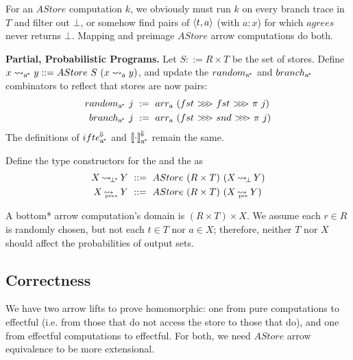 \documentclass{llncs}
\renewcommand{\paragraph}[1]{\vspace{0.5\baselineskip}\noindent\textbf{{#1}.}\hspace{0.25\baselineskip}}
\newcommand{\arrow}{\rightsquigarrow}
\newcommand{\conv}{^{\mspace{-2mu}\Downarrow\mspace{-2mu}}}
\newcommand{\meaningofconv}[1]{\left\llbracket{#1}\right\rrbracket\conv}
\newcommand{\arrowarr}{\ensuremath{arr}}
\newcommand{\arrowcomp}{\ensuremath{{>}\mspace{-6mu}{>}\mspace{-6mu}{>}}}
\newcommand{\arrowconvif}{\ensuremath{ifte\conv}}
\newcommand{\gen}{_\mathrm{a}}
\newcommand{\genc}{_\mathrm{a^{\mspace{-2mu}*}}}
\DeclareMathOperator{\botto}{\arrow_{\mspace{-3mu}\bot}}
\newcommand{\pre}{_\mathrm{pre}}
\DeclareMathOperator{\preto}{\arrow_{\mspace{-19mu}\pre}}
\newcommand{\pbot}{{\bot^{\mspace{-4mu}*}}}
\DeclareMathOperator{\pbotto}{\arrow_{\mspace{-3mu}\pbot}}
\DeclareMathOperator{\ppreto}{\arrow_{\mspace{-19mu}_{\mathrm{pre*}}}}
\begin{document}
For an $AStore$ computation $k$, we obviously must run $k$ on every branch trace in $T$ and filter out $\bot$, or somehow find pairs of $\langle{t,a}\rangle$ (with $a : x$) for which $agrees$ never returns $\bot$.
Mapping and preimage $AStore$ arrow computations do both.

\paragraph{Partial, Probabilistic Programs}
Let $S ::= R \times T$ be the set of stores.
Define $x \arrow\genc y ::= AStore~S~(x \arrow\gen y)$, and update the $random\genc$ and $branch\genc$ combinators to reflect that stores are now pairs:
\begin{equation}
\begin{aligned}
	random\genc~j &\ := \ \arrowarr\gen~(fst~\arrowcomp~fst~\arrowcomp~\pi~j)
\\
	branch\genc~j &\ := \ \arrowarr\gen~(fst~\arrowcomp~snd~\arrowcomp~\pi~j)
\end{aligned}
\end{equation}
The definitions of $\arrowconvif\genc$ and $\meaningofconv{\cdot}\genc$ remain the same.

\begin{definition}
Define the type constructors for the  and the  as
\begin{equation}
\begin{aligned}
	X \pbotto Y &\ ::=\ AStore~(R \times T)~(X \botto Y) \\
	X \ppreto Y &\ ::=\ AStore~(R \times T)~(X \preto Y) \\
\end{aligned}
\end{equation}
\end{definition}

A bottom* arrow computation's domain is $(R \times T) \times X$.
We assume each $r \in R$ is randomly chosen, but not each $t \in T$ nor $a \in X$; therefore, neither $T$ nor $X$ should affect the probabilities of output sets.

\subsection{Correctness}

We have two arrow lifts to prove homomorphic: one from pure computations to effectful (i.e. from those that do not access the store to those that do), and one from effectful computations to effectful.
For both, we need $AStore$ arrow equivalence to be more extensional.
\end{document}
